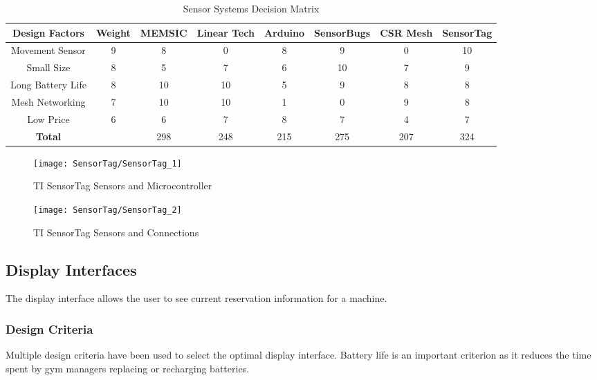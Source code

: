 \documentclass[PPFS.tex]{template/subfiles}
\begin{document}
\begin{table}[H]
   	\begin{center}
   		\caption{Sensor Systems Decision Matrix}
   		\label{tab:sensorsMatrix}
   		\begin{tabular}{|c|c|c|c|c|c|c|c|}
   			\hline
   			Design Factors & Weight & MEMSIC & Linear Tech & Arduino & SensorBugs & CSR Mesh & SensorTag \\
   			\hline
   			Movement Sensor & 9 & 8 & 0 & 8 & 9 & 0 & 10 \\
   			\hline
   			Small Size & 8 & 5 & 7 & 6 & 10 & 7 & 9 \\
   			\hline
   			Long Battery Life & 8 & 10 & 10 & 5 & 9 & 8 & 8 \\
   			\hline
   			Mesh Networking & 7 & 10 & 10 & 1 & 0 & 9 & 8 \\
   			\hline
   			Low Price & 6 & 6 & 7 & 8 & 7 & 4 & 7 \\
   			\hline
   			\textbf{Total} & & 298 & 248 & 215 & 275 & 207 & 324 \\
   			\hline
   		\end{tabular}
   	\end{center}
\end{table}

\begin{figure}[H]
	\centering
	\texttt{[image: SensorTag/SensorTag\_1]}
	\caption{TI SensorTag Sensors and Microcontroller}
	\label{fig:TISensorTag1}
\end{figure}

\begin{figure}[H]
	\centering
	\texttt{[image: SensorTag/SensorTag\_2]}
	\caption{TI SensorTag Sensors and Connections}
	\label{fig:TISensorTag2}
\end{figure}

\subsection{Display Interfaces}

The display interface allows the user to see current reservation information for a machine.

\subsubsection{Design Criteria}

Multiple design criteria have been used to select the optimal display interface. Battery life is an important criterion as it reduces the time spent by gym managers replacing or recharging batteries.
\end{document}
